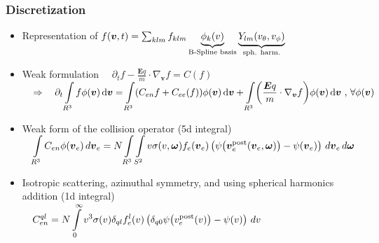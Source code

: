 \documentclass[mathserif, aspectratio=169]{beamer}
\newcommand{\ud}{\,\mathrm{d}}
\newcommand{\vect}[1]{\boldsymbol{#1}}
\newcommand{\of}[1]{\mleft( #1 \mright)}
\newcommand{\myint}{\int\limits}
\newcommand{\diff}[1]{\, d#1}
\begin{document}
\begin{frame}
	\frametitle{Discretization}
	\small
	\begin{itemize}
		\item Representation of $f\of{\vect{v},t} = \sum_{klm} f_{klm} \underbrace{\phi_k\of{v}}_{\text{B-Spline basis}} \underbrace{Y_{lm}\of{v_\theta, v_\phi}}_{\tiny\text{sph. harm.}}$ 
		\item Weak formulation
			$
			\displaystyle
			\quad
			\partial_t f - \frac{\vect{E} q}{m} \cdot \nabla_{\vect{v}}f = C(f)
			\quad $ \\
			$
			\displaystyle
			\quad
			\Rightarrow \quad
			\partial_t \myint_{R^3} f \phi\of{\vect{v}} \ud \vect{v} = 
			\myint_{R^3} \of{C_{en}f + C_{ee}(f)} \phi\of{\vect{v}} \ud \vect{v} + \myint_{R^3} \of{\frac{\vect{E} q}{m} \cdot \nabla_{\vect{v}} f} \phi(\vect{v}) \ud \vect{v}\text{ , } 
			\forall \phi(\vect{v})$
		\item Weak form of the collision operator (5d integral) \\
			$
			\displaystyle
			\quad 
			\myint_{R^3} C_{en} \phi\of{\vect{v}_e} \diff{\vect{v}_e} 
			=
			N \myint_{R^3} \myint_{S^2} 
			v\sigma(v,\vect{\omega})
			f_e\of{\vect{v}_e}
			\left(
			\psi\of{\vect{v}_e^\text{post}\of{\vect{v}_e, \vect{\omega}}} 
			- \psi\of{\vect{v}_e} 
			\right)
			\diff{\vect{v}_e} \diff{\vect{\omega}}
			$
		\item Isotropic scattering, azimuthal symmetry, and using spherical harmonics addition (1d integral)\\
		$
		\displaystyle
		\quad 
		C_{en}^{ql} 
		=
		N \myint_{0}^{\infty} 
		v^3\sigma(v)\delta_{ql}
		f_e^{l}\of{v}
		\left(
		\delta_{q0}\psi\of{v_e^\text{post}\of{v}} - \psi\of{v} 
		\right)
		\diff{v} 
		$ 
	\end{itemize}
\end{frame}
\end{document}
